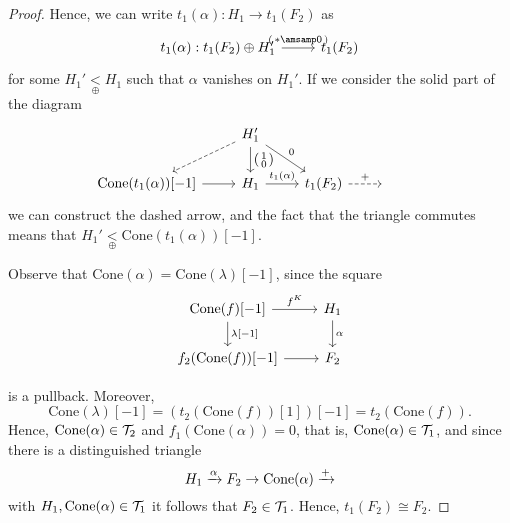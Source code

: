 \begin{proof}
  Hence, we can write $ t_1(\alpha):H_1\to  t_1(F_2)$
  as
  \begin{equation*}
    \begin{tikzcd}
       t_1(\alpha): t_1(F_2)\oplus H_1'
      \arrow{r}{
          \begin{psmallmatrix}
            \ast \amsamp 0
          \end{psmallmatrix}
          }
        &  t_1(F_2)
    \end{tikzcd}
  \end{equation*}
  for some $H_1'\underset{\oplus}{<} H_1$ such that
  $\alpha$ vanishes on $H_1'$. If we consider the solid part of the diagram
  \begin{equation*}
    \begin{tikzcd}
      & H_1'\arrow[dashed]{dl}
      \arrow{d}{
        \begin{psmallmatrix}
          1 \\ 0
        \end{psmallmatrix}
      }\arrow{dr}{0}
        & & &\\
      \mathrm{Cone}( t_1(\alpha))[-1]\arrow{r}
        & H_1\arrow{r}{ t_1(\alpha)}
          &  t_1(F_2)\arrow[dashed]{r}{+}
            & {}
    \end{tikzcd}
  \end{equation*}
  we can construct the dashed arrow, and the fact that the triangle commutes means
  that $H_1'\underset{\oplus}{<}\mathrm{Cone}( t_1(\alpha))[-1]$.

  Observe that $\mathrm{Cone}(\alpha)=\mathrm{Cone}(\lambda)[-1]$, since
  the square
  \begin{equation*}
    \begin{tikzcd}
      \mathrm{Cone}(f)[-1]\arrow{r}{f^K}\arrow{d}{\lambda[-1]}
        & H_1\arrow{d}{\alpha} \\
       f_2(\mathrm{Cone}(f))[-1]\arrow{r}
        & F_2
    \end{tikzcd}
  \end{equation*}
  \begin{sloppypar}
  is a pullback. Moreover, \[\mathrm{Cone}(\lambda)[-1] = ( t_2(\mathrm{Cone}(f))[1])[-1]
  = t_2(\mathrm{Cone}(f)).\] Hence, $\mathrm{Cone}(\alpha)\in \mathcal{T}_2$ and
  $ f_1(\mathrm{Cone}(\alpha))=0$, that is,
  ${\mathrm{Cone}(\alpha)\in\mathcal{T}_1}$, and since there is a distinguished triangle
  \begin{equation*}
    H_1\xrightarrow{\alpha} F_2\to \mathrm{Cone}(\alpha)\xrightarrow{+}
  \end{equation*}
  with $H_1,\mathrm{Cone}(\alpha)\in\mathcal{T}_1$ it follows that
  $F_2\in\mathcal{T}_1$. Hence, ${ t_1(F_2)\cong F_2}$.
\end{sloppypar}


\end{proof}
